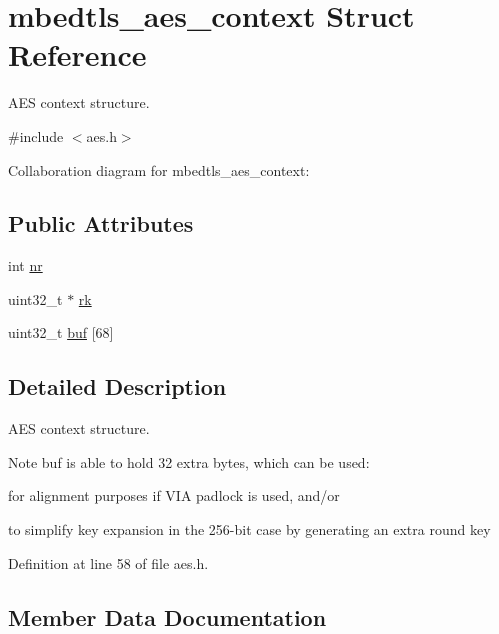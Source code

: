 \hypertarget{structmbedtls__aes__context}{}\section{mbedtls\+\_\+aes\+\_\+context Struct Reference}
\label{structmbedtls__aes__context}


A\+ES context structure.  




{\ttfamily \#include $<$aes.\+h$>$}



Collaboration diagram for mbedtls\+\_\+aes\+\_\+context\+:
\subsection*{Public Attributes}
\begin{DoxyCompactItemize}
\item 
int \mbox{\hyperlink{structmbedtls__aes__context_ad0b4f626fa3881c76f23a9a96812b69a}{nr}}
\item 
uint32\+\_\+t $\ast$ \mbox{\hyperlink{structmbedtls__aes__context_ac7e235e5b270daba3635f5e39949b7a4}{rk}}
\item 
uint32\+\_\+t \mbox{\hyperlink{structmbedtls__aes__context_ad9a8f020a5028732e2cf3c8e07b39795}{buf}} \mbox{[}68\mbox{]}
\end{DoxyCompactItemize}


\subsection{Detailed Description}
A\+ES context structure. 

\begin{DoxyNote}{Note}
buf is able to hold 32 extra bytes, which can be used\+:
\begin{DoxyItemize}
\item for alignment purposes if V\+IA padlock is used, and/or
\item to simplify key expansion in the 256-\/bit case by generating an extra round key 
\end{DoxyItemize}
\end{DoxyNote}


Definition at line 58 of file aes.\+h.



\subsection{Member Data Documentation}
\mbox{\label{structmbedtls__aes__context_ad9a8f020a5028732e2cf3c8e07b39795}} 

